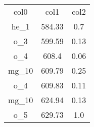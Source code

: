 \begin{table}
\begin{tabular}{ccc}
col0 & col1 & col2 \\
he_1 & 584.33 & 0.7 \\
o_3 & 599.59 & 0.13 \\
o_4 & 608.4 & 0.06 \\
mg_10 & 609.79 & 0.25 \\
o_4 & 609.83 & 0.11 \\
mg_10 & 624.94 & 0.13 \\
o_5 & 629.73 & 1.0 \\
\end{tabular}
\end{table}
